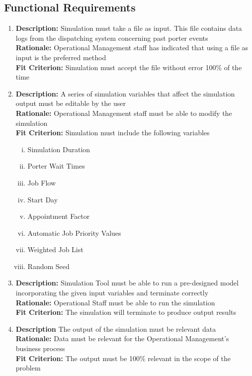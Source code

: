 \documentclass[paper=letter, fontsize=10pt]{scrartcl}
\numberwithin{equation}{section}		%
\numberwithin{figure}{section}			%
\numberwithin{table}{section}				%
\begin{document}
\subsection{Functional Requirements}
\begin{enumerate}
	\item \textbf{Description:} Simulation must take a file as input. This file contains data logs from the dispatching system concerning past porter events
	\\ \textbf{Rationale:} Operational Management staff has indicated that using a file as input is the preferred method 
	\\ \textbf{Fit Criterion:} Simulation must accept the file without error 100\% of the time
	\item \textbf{Description:} A series of simulation variables that affect the simulation output must be editable by the user
	\\ \textbf{Rationale:} Operational Management staff must be able to modify the simulation
	\\ \textbf{Fit Criterion:} Simulation must include the following variables   
	\begin{enumerate}[(i)]
		\item Simulation Duration
		\item Porter Wait Times
		\item Job Flow
		\item Start Day
		\item Appointment Factor
		\item Automatic Job Priority Values
		\item Weighted Job List
		\item Random Seed
	\end{enumerate}
	\item \textbf{Description:} Simulation Tool must be able to run a pre-designed model incorporating the given input variables and terminate correctly
	\\ \textbf{Rationale:} Operational Staff must be able to run the simulation
	\\ \textbf{Fit Criterion:} The simulation will terminate to produce output results
	\item \textbf{Description} The output of the simulation must be relevant data
	\\ \textbf{Rationale:} Data must be relevant for the Operational Management's business process
	\\ \textbf{Fit Criterion:} The output must be 100\% relevant in the scope of the problem

\end{enumerate}
\end{document}
